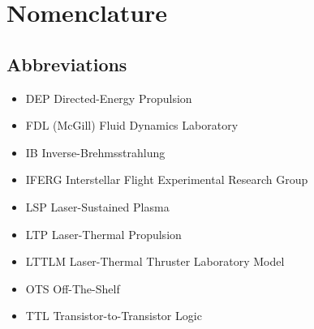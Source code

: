 \chapter*{Nomenclature}
\setlength{\columnsep}{1cm}
\newenvironment{nomtable}
    {
        \centering
        \tabularx{\columnwidth}{r>{\raggedright\arraybackslash}X}
    }
    {
        \endtabularx
    }
\newenvironment{nomlist}
    {
        \begin{itemize}[leftmargin=1.5cm]
            \raggedright
            \setlength{\parsep}{0pt}
            \setlength{\itemsep}{-4pt}
    }
    {
        \end{itemize}
    }
\begin{multicols*}{2}
    \section*{Abbreviations}

    \begin{nomlist}
        \item[DEP]              Directed-Energy Propulsion
        \item[FDL]              (McGill) Fluid Dynamics Laboratory
        \item[IB]               Inverse-Brehmsstrahlung 
        \item[IFERG]            Interstellar Flight Experimental Research Group
        \item[LSP]              Laser-Sustained Plasma
        \item[LTP]              Laser-Thermal Propulsion
        \item[LTTLM]            Laser-Thermal Thruster Laboratory Model
        \item[OTS]              Off-The-Shelf
        \item[TTL]              Transistor-to-Transistor Logic
    \end{nomlist}


\end{multicols*}

